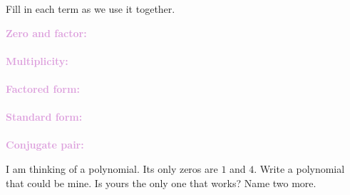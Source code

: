 \documentclass[10pt]{article}
\begin{document}

\vspace{0.12in}

\boxguard
\begin{vocabbox}
Fill in each term as we use it together.
\par\vspace{2pt}
\noindent\textbf{\textcolor{plum}{Zero and factor:}}\\[1pt]
\writeline\\[3pt]
\noindent\textbf{\textcolor{plum}{Multiplicity:}}\\[1pt]
\writeline\\[3pt]
\noindent\textbf{\textcolor{plum}{Factored form:}}\\[1pt]
\writeline\\[3pt]
\noindent\textbf{\textcolor{plum}{Standard form:}}\\[1pt]
\writeline\\[3pt]
\noindent\textbf{\textcolor{plum}{Conjugate pair:}}\\[1pt]
\writeline
\end{vocabbox}

\vspace{0.1in}

\boxguard
\begin{hookbox}
I am thinking of a polynomial. Its only zeros are $1$ and $4$. Write a polynomial that could
be mine. Is yours the only one that works? Name two more.
\end{hookbox}
\end{document}
